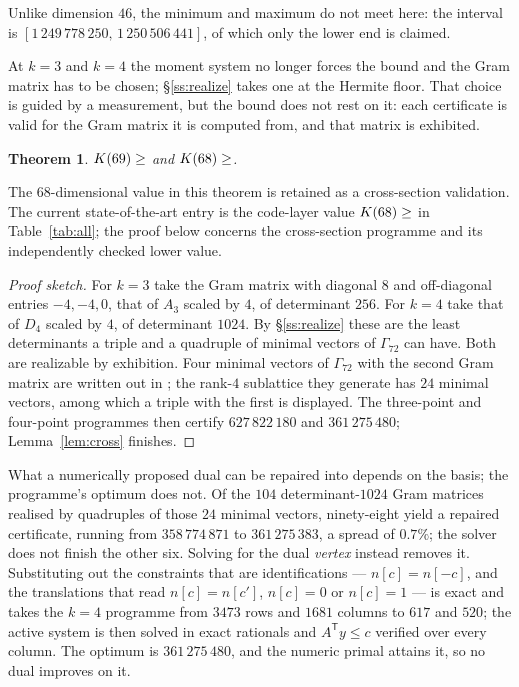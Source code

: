 \documentclass[11pt]{amsart}
\newtheorem{theorem}{Theorem}[section]
\theoremstyle{remark}
\newcommand{\Gsz}{\Gamma_{72}}
\begin{document}
Unlike dimension $46$, the minimum and maximum do not meet here: the interval is
$[1\,249\,778\,250,\,1\,250\,506\,441]$, of which only the lower end is claimed.

At $k=3$ and $k=4$ the moment system no longer forces the bound and the Gram
matrix has to be chosen; \S\ref{ss:realize} takes one at the Hermite floor. That
choice is guided by a measurement, but the bound does not rest on it: each
certificate is valid for the Gram matrix it is computed from, and that matrix is
exhibited.

\begin{theorem}\label{thm:6869}
$K(69)\ge\Kh{69}$ and $K(68)\ge\Kh{68}$.
\end{theorem}

The $68$-dimensional value in this theorem is retained as a cross-section
validation. The current state-of-the-art entry is the code-layer value
$K(68)\ge\Kcur{68}$ in Table~\ref{tab:all}; the proof below concerns the
cross-section programme and its independently checked lower value.

\begin{proof}[Proof sketch]
For $k=3$ take the Gram matrix with diagonal $8$ and off-diagonal entries
$-4,-4,0$, that of $A_3$ scaled by $4$, of determinant $256$. For $k=4$ take that
of $D_4$ scaled by $4$, of determinant $1024$. By \S\ref{ss:realize} these are
the least determinants a triple and a quadruple of minimal vectors of $\Gsz$ can
have. Both are realizable by exhibition. Four minimal vectors of $\Gsz$ with the
second Gram matrix are written out in \cite{repo}; the rank-$4$ sublattice they
generate has $24$ minimal vectors, among which a triple with the first is
displayed. The three-point and four-point programmes then certify $627\,822\,180$
and $361\,275\,480$; Lemma~\ref{lem:cross} finishes.
\end{proof}

What a numerically proposed dual can be repaired into depends on the basis; the
programme's optimum does not. Of the $104$ determinant-$1024$ Gram matrices
realised by quadruples of those $24$ minimal vectors, ninety-eight yield a repaired
certificate, running from $358\,774\,871$ to $361\,275\,383$, a spread of $0.7\%$;
the solver does not finish the other six. Solving for the dual \emph{vertex}
instead removes it. Substituting out the
constraints that are identifications --- $n[c]=n[-c]$, and the translations that
read $n[c]=n[c']$, $n[c]=0$ or $n[c]=1$ --- is exact and takes the $k=4$
programme from $3473$ rows and $1681$ columns to $617$ and $520$; the active
system is then solved in exact rationals and $A^{\mathsf T}y\le c$ verified over
every column. The optimum is
$361\,275\,480$, and the numeric primal attains it, so no dual improves on it.
\end{document}
